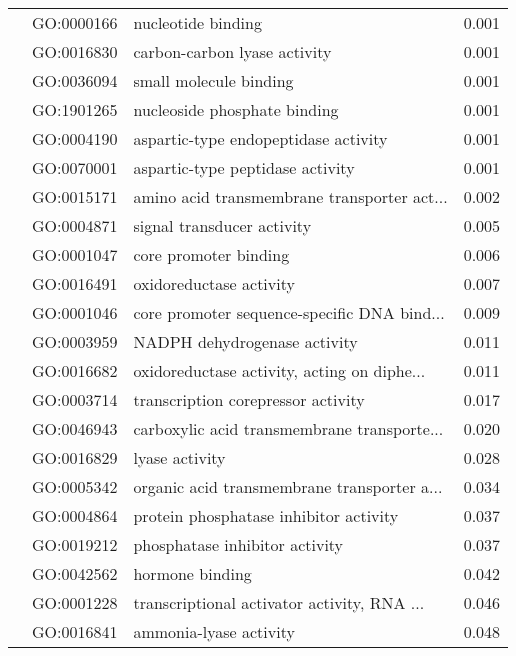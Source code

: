 \begin{longtable}{lllr}
   & GO:0000166 &                           nucleotide binding &         0.001 \\
   & GO:0016830 &                 carbon-carbon lyase activity &         0.001 \\
   & GO:0036094 &                       small molecule binding &         0.001 \\
   & GO:1901265 &                 nucleoside phosphate binding &         0.001 \\
   & GO:0004190 &         aspartic-type endopeptidase activity &         0.001 \\
   & GO:0070001 &             aspartic-type peptidase activity &         0.001 \\
   & GO:0015171 &  amino acid transmembrane transporter act... &         0.002 \\
   & GO:0004871 &                   signal transducer activity &         0.005 \\
   & GO:0001047 &                        core promoter binding &         0.006 \\
   & GO:0016491 &                      oxidoreductase activity &         0.007 \\
   & GO:0001046 &  core promoter sequence-specific DNA bind... &         0.009 \\
   & GO:0003959 &                 NADPH dehydrogenase activity &         0.011 \\
   & GO:0016682 &  oxidoreductase activity, acting on diphe... &         0.011 \\
   & GO:0003714 &           transcription corepressor activity &         0.017 \\
   & GO:0046943 &  carboxylic acid transmembrane transporte... &         0.020 \\
   & GO:0016829 &                               lyase activity &         0.028 \\
   & GO:0005342 &  organic acid transmembrane transporter a... &         0.034 \\
   & GO:0004864 &       protein phosphatase inhibitor activity &         0.037 \\
   & GO:0019212 &               phosphatase inhibitor activity &         0.037 \\
   & GO:0042562 &                              hormone binding &         0.042 \\
   & GO:0001228 &  transcriptional activator activity, RNA ... &         0.046 \\
   & GO:0016841 &                       ammonia-lyase activity &         0.048 \\

\end{longtable}
